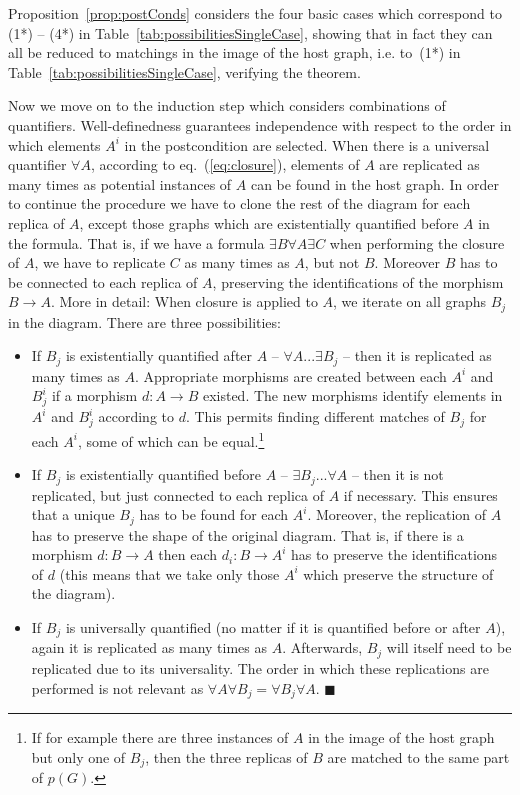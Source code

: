 \documentclass{fundam}
\newcommand{\abb}[3]{#1 \colon #2 \rightarrow #3}
\newcommand{\proofend}{\hfill$\blacksquare$}
\begin{document}
Proposition~\ref{prop:postConds} considers the four basic cases which
correspond to (1*) -- (4*) in Table~\ref{tab:possibilitiesSingleCase},
showing that in fact they can all be reduced to matchings in the image
of the host graph, i.e. to~(1*) in
Table~\ref{tab:possibilitiesSingleCase}, verifying the theorem.

Now we move on to the induction step which considers combinations of
quantifiers. Well-definedness guarantees independence with respect to
the order in which elements $A^i$ in the postcondition are
selected. When there is a universal quantifier $\forall A$, according
to eq.~(\ref{eq:closure}), elements of $A$ are replicated as many
times as potential instances of $A$ can be found in the host graph.
In order to continue the procedure we have to clone the rest of the
diagram for each replica of $A$, except those graphs which are
existentially quantified before $A$ in the formula. That is, if we
have a formula $\exists B \forall A \exists C$ when performing the
closure of $A$, we have to replicate $C$ as many times as $A$, but not
$B$.  Moreover $B$ has to be connected to each replica of $A$,
preserving the identifications of the morphism $B \rightarrow A$.
More in detail: When closure is applied to $A$, we iterate on all
graphs $B_j$ in the diagram. There are three possibilities:

\begin{itemize}
\item If $B_j$ is existentially quantified after $A$ -- $\forall A ...
  \exists B_j$ -- then it is replicated as many times as $A$.
  Appropriate morphisms are created between each $A^i$ and $B^i_j$ if
  a morphism $\abb{d}{A}{B}$ existed. The new morphisms identify
  elements in $A^i$ and $B^i_j$ according to $d$.  This permits finding
  different matches of $B_j$ for each $A^i$, some of which can be
  equal.\footnote{If for example there are three instances of $A$ in
    the image of the host graph but only one of $B_j$, then the three
    replicas of $B$ are matched to the same part of $p(G)$.}
\item If $B_j$ is existentially quantified before $A$ -- $\exists B_j
  ... \forall A$ -- then it is not replicated, but just connected to
  each replica of $A$ if necessary. This ensures that a unique $B_j$
  has to be found for each $A^i$. Moreover, the replication of $A$ has
  to preserve the shape of the original diagram. That is, if there is
  a morphism $\abb{d}{B}{A}$ then each $\abb{d_i}{B}{A^i}$ has to
  preserve the identifications of $d$ (this means that we take only
  those $A^i$ which preserve the structure of the diagram).
\item If $B_j$ is universally quantified (no matter if it is
  quantified before or after $A$), again it is replicated as many
  times as $A$. Afterwards, $B_j$ will itself need to be replicated
  due to its universality. The order in which these replications are
  performed is not relevant as $\forall A \forall B_j = \forall B_j
  \forall A$. \proofend
\end{itemize}
\end{document}
